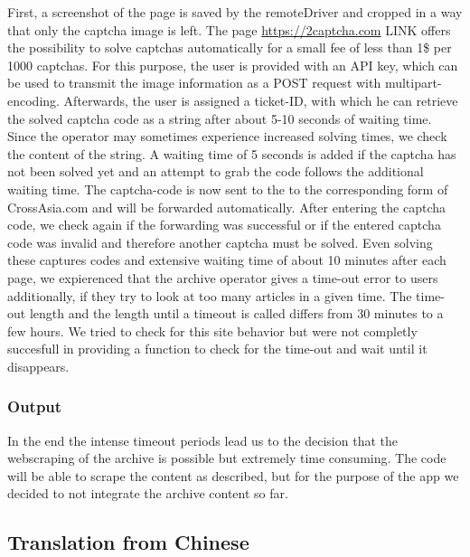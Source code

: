 \documentclass[12pt,a4paper]{article}
\begin{document}
First, a screenshot of the page is saved by the remoteDriver and cropped
in a way that only the captcha image is left. The page
\url{https://2captcha.com} LINK offers the possibility to solve captchas
automatically for a small fee of less than 1\$ per 1000 captchas. For
this purpose, the user is provided with an API key, which can be used to
transmit the image information as a POST request with
multipart-encoding. Afterwards, the user is assigned a ticket-ID, with
which he can retrieve the solved captcha code as a string after about
5-10 seconds of waiting time. Since the operator may sometimes
experience increased solving times, we check the content of the string.
A waiting time of 5 seconds is added if the captcha has not been solved
yet and an attempt to grab the code follows the additional waiting time.
The captcha-code is now sent to the to the corresponding form of
CrossAsia.com and will be forwarded automatically. After entering the
captcha code, we check again if the forwarding was successful or if the
entered captcha code was invalid and therefore another captcha must be
solved. Even solving these captures codes and extensive waiting time of
about 10 minutes after each page, we expierenced that the archive
operator gives a time-out error to users additionally, if they try to
look at too many articles in a given time. The time-out length and the
length until a timeout is called differs from 30 minutes to a few hours.
We tried to check for this site behavior but were not completly
succesfull in providing a function to check for the time-out and wait
until it disappears.

\hypertarget{output}{%
\subsubsection{Output}\label{output}}

In the end the intense timeout periods lead us to the decision that the
webscraping of the archive is possible but extremely time consuming. The
code will be able to scrape the content as described, but for the
purpose of the app we decided to not integrate the archive content so
far.

\hypertarget{translation-from-chinese}{%
\subsection{Translation from Chinese}\label{translation-from-chinese}}
\end{document}
